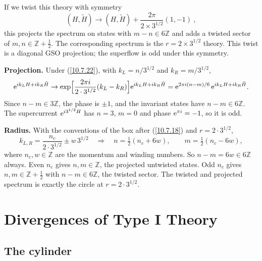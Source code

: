 	If we twist this theory with symmetry
	\begin{equation}
		(H,\tilde{H}) \to (H,\tilde{H})+ \frac{2\pi}{2\times 3^{1/2}}(1,-1)\:, \label{10.7.22}
	\end{equation}
	this projects the spectrum on states with $m-n\in 6\mathds{Z}$ and adds a twisted sector of $m,n\in\mathds{Z}+\frac{1}{2}$. The corresponding spectrum is the $r=2\times 3^{1/2}$ theory. This twist is a diagonal GSO projection; the superflow is odd under this symmetry.
	\begin{tcolorbox}[breakable]
		\begin{remark}
			\textbf{Projection.} Under (\ref{10.7.22}), with $k_L=n/3^{1/2}$ and $k_R=m/3^{1/2}$,
			\begin{equation*}
				\mathrm{e}^{i k_LH+i k_R\tilde H}\to\exp\Bigl[\frac{2\pi i}{2\cdot3^{1/2}}(k_L-k_R)\Bigr]\mathrm{e}^{i k_LH+i k_R\tilde H}=\mathrm{e}^{2\pi i(n-m)/6}\,\mathrm{e}^{i k_LH+i k_R\tilde H} .
			\end{equation*}
			Since $n-m\in3\mathds Z$, the phase is $\pm1$, and the invariant states have $n-m\in6\mathds Z$. The supercurrent $\mathrm{e}^{i3^{1/2}H}$ has $n=3$, $m=0$ and phase $\mathrm{e}^{\pi i}=-1$, so it is odd.

			\textbf{Radius.} With the conventions of the box after (\ref{10.7.18}) and $r=2\cdot3^{1/2}$,
			\begin{equation*}
				k_{L,R}=\frac{n_c}{2\cdot3^{1/2}}\pm w\,3^{1/2}\quad\Longrightarrow\quad n=\tfrac12(n_c+6w),\qquad m=\tfrac12(n_c-6w),
			\end{equation*}
			where $n_c,w\in\mathds Z$ are the momentum and winding numbers. So $n-m=6w\in6\mathds Z$ always. Even $n_c$ gives $n,m\in\mathds Z$, the projected untwisted states. Odd $n_c$ gives $n,m\in\mathds Z+\tfrac12$ with $n-m\in6\mathds Z$, the twisted sector. The twisted and projected spectrum is exactly the circle at $r=2\cdot3^{1/2}$.
		\end{remark}
	\end{tcolorbox}
	
	
	
	\section{Divergences of Type I Theory}
	
	\subsection*{The cylinder}
	
